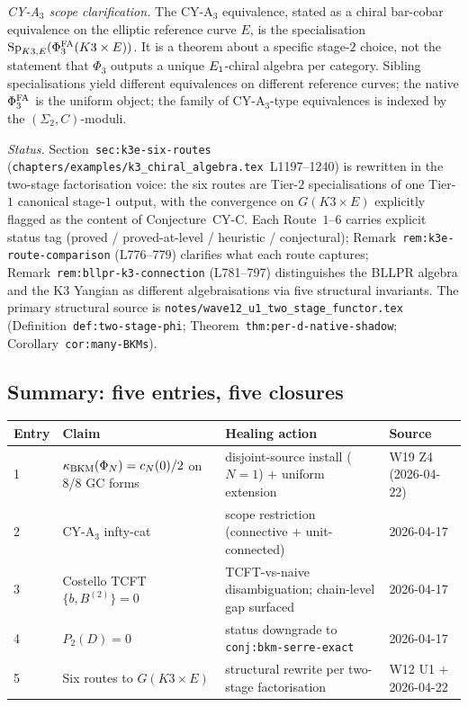 \emph{CY-A$_3$ scope clarification.}  The CY-A$_3$ equivalence, stated
as a chiral bar-cobar equivalence on the elliptic reference curve $E$,
is the specialisation
$\mathrm{Sp}_{K3, E}(\Phi^{\mathrm{FA}}_3(K3 \times E))$.  It is a theorem about a
specific stage-$2$ choice, not the statement that $\Phi_3$ outputs a
unique $E_1$-chiral algebra per category.  Sibling specialisations
yield different equivalences on different reference curves; the
native $\Phi^{\mathrm{FA}}_3$ is the uniform object; the family of
CY-A$_3$-type equivalences is indexed by the
$(\Sigma_2, C)$-moduli.

\emph{Status.}  \ClaimStatusHealed{}  Section~\texttt{sec:k3e-six-routes}
(\texttt{chapters/examples/k3\_chiral\_algebra.tex}~L1197--1240) is
rewritten in the two-stage factorisation voice: the six routes are
Tier-$2$ specialisations of one Tier-$1$ canonical stage-$1$ output,
with the convergence on $G(K3 \times E)$ explicitly flagged as the
content of Conjecture~CY-C.  Each Route~$1$--$6$ carries explicit
status tag (proved / proved-at-level / heuristic / conjectural);
Remark~\texttt{rem:k3e-route-comparison} (L776--779) clarifies what
each route captures; Remark~\texttt{rem:bllpr-k3-connection}
(L781--797) distinguishes the BLLPR algebra and the K3 Yangian as
different algebraisations via five structural invariants.  The
primary structural source is
\texttt{notes/wave12\_u1\_two\_stage\_functor.tex}
(Definition~\texttt{def:two-stage-phi};
Theorem~\texttt{thm:per-d-native-shadow};
Corollary~\texttt{cor:many-BKMs}).

\subsection*{Summary: five entries, five closures}
\label{wn:sec:tautology-healing-summary}

\begin{center}
\renewcommand{\arraystretch}{1.3}
\begin{tabular}{l|l|l|l}
Entry & Claim & Healing action & Source \\\hline
1 & $\kappa_{\mathrm{BKM}}(\Phi_N) = c_N(0)/2$ on 8/8 GC forms &
    disjoint-source install ($N = 1$) $+$ uniform extension &
    W19 Z4 (2026-04-22) \\
2 & CY-A$_3$ infty-cat & scope restriction (connective $+$ unit-connected) &
    2026-04-17 \\
3 & Costello TCFT $\{b, B^{(2)}\} = 0$ &
    TCFT-vs-naive disambiguation; chain-level gap surfaced &
    2026-04-17 \\
4 & $P_2(D) = 0$ & status downgrade to \texttt{conj:bkm-serre-exact} &
    2026-04-17 \\
5 & Six routes to $G(K3 \times E)$ &
    structural rewrite per two-stage factorisation &
    W12 U1 $+$ 2026-04-22 \\
\end{tabular}
\end{center}

